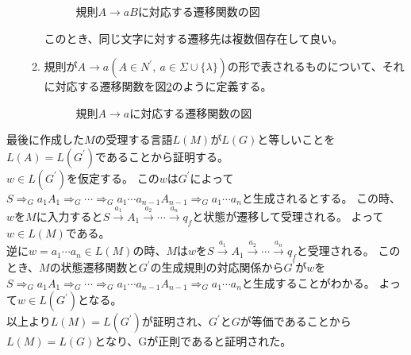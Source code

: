 \documentclass[uplatex,dvipdfmx,a4paper,10pt]{jsarticle}
\begin{document}
\begin{enumerate}
\begin{enumerate}
\begin{figure}[H]
          \caption{規則\(A \rightarrow aB\)に対応する遷移関数の図}
          \label{picture_state_transition_1}
        \end{figure}

        このとき、同じ文字に対する遷移先は複数個存在して良い。
        \item 規則が\(A \rightarrow a(A \in N^{'},\ a \in \Sigma \cup \{\lambda\})\)の形で表されるものについて、それに対応する遷移関数を図\ref{picture_state_transition_2}のように定義する。
        
        \begin{figure}[H]
          \centering
          \caption{規則\(A \rightarrow a\)に対応する遷移関数の図}
          \label{picture_state_transition_2}
        \end{figure}

      \end{enumerate}
    \end{enumerate}
    \hspace{1em}最後に作成した\(M\)の受理する言語\(L(M)\)が\(L(G)\)と等しいことを\(L(A) = L(G^{'})\)であることから証明する。\\
    \hspace{1em}\(w \in L(G^{'})\)を仮定する。
    この\(w\)は\(G^{'}\)によって\(S \Rightarrow_G a_1A_1 \Rightarrow_G \cdots \Rightarrow_G a_1 \cdots a_{n-1}A_{n-1} \Rightarrow_G a_1 \cdots a_n\)と生成されるとする。
    この時、\(w\)を\(M\)に入力すると\(S \xrightarrow{a_1} A_1 \xrightarrow{a_2} \cdots \xrightarrow{a_n} q_f\)と状態が遷移して受理される。
    よって\(w \in L(M)\)である。 \\
    \hspace{1em}逆に\(w = a_1 \cdots a_n \in L(M)\)の時、\(M\)は\(w\)を\(S \xrightarrow{a_1} A_1 \xrightarrow{a_2} \cdots \xrightarrow{a_n} q_f\)と受理される。
    このとき、\(M\)の状態遷移関数と\(G^{'}\)の生成規則の対応関係から\(G^{'}\)が\(w\)を\(S \Rightarrow_G a_1A_1 \Rightarrow_G \cdots \Rightarrow_G a_1 \cdots a_{n-1}A_{n-1} \Rightarrow_G a_1 \cdots a_n\)と生成することがわかる。
    よって\(w \in L(G^{'})\)となる。 \\
    \hspace{1em}以上より\(L(M) = L(G^{'})\)が証明され、\(G^{'}\)と\(G\)が等価であることから\(L(M) = L(G)\)となり、Gが正則であると証明された。
\end{document}
